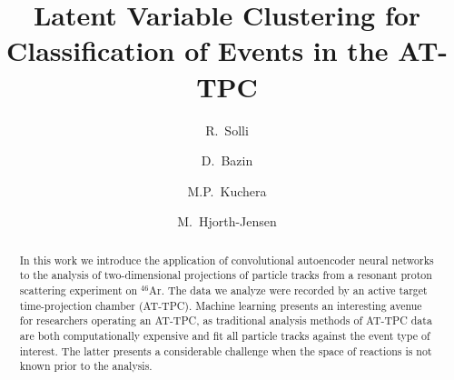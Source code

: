 \documentclass[preprint,12pt]{elsarticle}
\begin{document}
\begin{frontmatter}


\title{Latent Variable Clustering for Classification of Events in the AT-TPC}


\author{R.~Solli}
\address{Department of Physics, University of Oslo, POB 1048 Oslo, N-0316 Oslo, Norway}

\author{D.~Bazin}
\address{Department of Physics and Astronomy and Facility for Rare Ion Beams and National Superconducting Cyclotron Facility, Michigan State University, East Lansing, MI 48824, USA}
\author{M.P.~Kuchera}
\address{Physics Department, Davidson College, Davidson, North Carolina, USA}
\author{M.~Hjorth-Jensen}
\address{Department of Physics and Astronomy and Facility for Rare Ion Beams and National Superconducting Cyclotron Facility, Michigan State University, East Lansing, MI 48824, USA}
\address{Department of Physics and Center for Computing in Science Education, University of Oslo, POB 1048 Oslo, N-0316 Oslo, Norway}


\begin{abstract}
In this work we introduce the application of convolutional autoencoder neural networks to the analysis of two-dimensional projections of particle tracks from a resonant proton scattering experiment on ${}^{46}$Ar. 
The data we analyze were recorded by an active target time-projection chamber (AT-TPC). Machine learning presents an interesting avenue for researchers operating an AT-TPC, as traditional analysis methods of AT-TPC data are both computationally expensive and fit all particle tracks against the event type of interest. The latter presents a considerable challenge when the space of reactions is not known prior to the analysis. 


\end{abstract}
\end{frontmatter}
\end{document}
